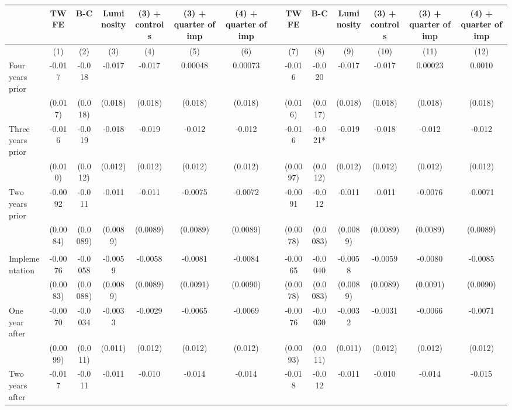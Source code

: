 \begin{tabular}{lccccccccccccc}
\toprule
      & TWFE  & B-C   & Luminosity & (3) + controls & (3) + quarter of imp & (4) + quarter of imp &       & TWFE  & B-C   & Luminosity & (3) + controls & (3) + quarter of imp & (4) + quarter of imp \\
\midrule
      & (1)   & (2)   & (3)   & (4)   & (5)   & (6)   &       & (7)   & (8)   & (9)   & (10)  & (11)  & (12) \\
\midrule
\midrule
Four years prior & -0.017 & -0.018 & -0.017 & -0.017 & 0.00048 & 0.00073 &       & -0.016 & -0.020 & -0.017 & -0.017 & 0.00023 & 0.0010 \\
      & (0.017) & (0.018) & (0.018) & (0.018) & (0.018) & (0.018) &       & (0.016) & (0.017) & (0.018) & (0.018) & (0.018) & (0.018) \\
Three years prior & -0.016 & -0.019 & -0.018 & -0.019 & -0.012 & -0.012 &       & -0.016 & -0.021* & -0.019 & -0.018 & -0.012 & -0.012 \\
      & (0.010) & (0.012) & (0.012) & (0.012) & (0.012) & (0.012) &       & (0.0097) & (0.012) & (0.012) & (0.012) & (0.012) & (0.012) \\
Two years prior & -0.0092 & -0.011 & -0.011 & -0.011 & -0.0075 & -0.0072 &       & -0.0091 & -0.012 & -0.011 & -0.011 & -0.0076 & -0.0071 \\
      & (0.0084) & (0.0089) & (0.0089) & (0.0089) & (0.0089) & (0.0089) &       & (0.0078) & (0.0083) & (0.0089) & (0.0089) & (0.0089) & (0.0089) \\
      &       &       &       &       &       &       &       &       &       &       &       &       &  \\
Implementation & -0.0076 & -0.0058 & -0.0059 & -0.0058 & -0.0081 & -0.0084 &       & -0.0065 & -0.0040 & -0.0058 & -0.0059 & -0.0080 & -0.0085 \\
      & (0.0083) & (0.0088) & (0.0089) & (0.0089) & (0.0091) & (0.0090) &       & (0.0078) & (0.0083) & (0.0089) & (0.0089) & (0.0091) & (0.0090) \\
One year after & -0.0070 & -0.0034 & -0.0033 & -0.0029 & -0.0065 & -0.0069 &       & -0.0076 & -0.0030 & -0.0032 & -0.0031 & -0.0066 & -0.0071 \\
      & (0.0099) & (0.011) & (0.011) & (0.012) & (0.012) & (0.012) &       & (0.0093) & (0.011) & (0.011) & (0.012) & (0.012) & (0.012) \\
Two years after & -0.017 & -0.011 & -0.011 & -0.010 & -0.014 & -0.014 &       & -0.018 & -0.012 & -0.011 & -0.010 & -0.014 & -0.015 \\

\end{tabular}
